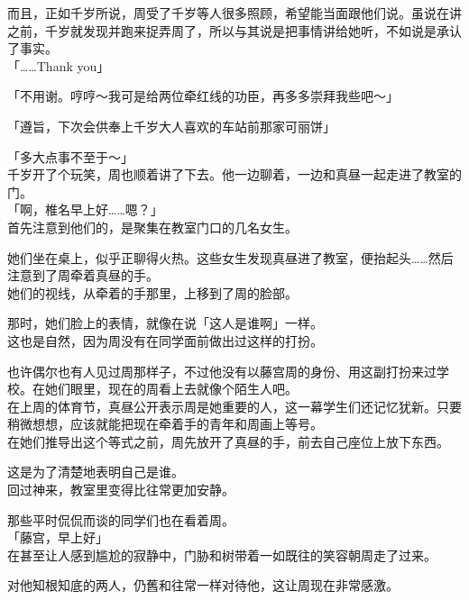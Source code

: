 而且，正如千岁所说，周受了千岁等人很多照顾，希望能当面跟他们说。虽说在讲之前，千岁就发现并跑来捉弄周了，所以与其说是把事情讲给她听，不如说是承认了事实。\\

「……Thank you」

「不用谢。哼哼～我可是给两位牵红线的功臣，再多多崇拜我些吧～」

「遵旨，下次会供奉上千岁大人喜欢的车站前那家可丽饼」

「多大点事不至于～」\\

千岁开了个玩笑，周也顺着讲了下去。他一边聊着，一边和真昼一起走进了教室的门。\\

「啊，椎名早上好……嗯？」\\

首先注意到他们的，是聚集在教室门口的几名女生。

她们坐在桌上，似乎正聊得火热。这些女生发现真昼进了教室，便抬起头……然后注意到了周牵着真昼的手。\\

她们的视线，从牵着的手那里，上移到了周的脸部。

那时，她们脸上的表情，就像在说「这人是谁啊」一样。\\

这也是自然，因为周没有在同学面前做出过这样的打扮。

也许偶尔也有人见过周那样子，不过他没有以藤宫周的身份、用这副打扮来过学校。在她们眼里，现在的周看上去就像个陌生人吧。\\

在上周的体育节，真昼公开表示周是她重要的人，这一幕学生们还记忆犹新。只要稍微想想，应该就能把现在牵着手的青年和周画上等号。\\

在她们推导出这个等式之前，周先放开了真昼的手，前去自己座位上放下东西。

这是为了清楚地表明自己是谁。\\

回过神来，教室里变得比往常更加安静。

那些平时侃侃而谈的同学们也在看着周。\\

「藤宫，早上好」\\

在甚至让人感到尴尬的寂静中，门胁和树带着一如既往的笑容朝周走了过来。

对他知根知底的两人，仍舊和往常一样对待他，这让周现在非常感激。\\

